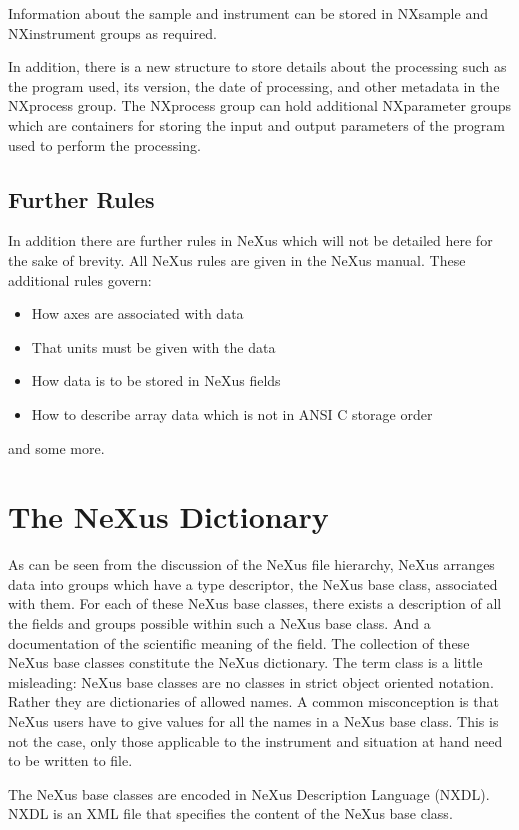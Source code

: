 \documentclass[%
 aip,
rsi,
 amsmath,amssymb,
 reprint,%
]{revtex4-1}
\begin{document}
Information about the sample and instrument can be stored in NXsample and NXinstrument groups as required. 

In addition, there is a new structure to store details about the processing such as the program used, its version, 
the date of processing, and other metadata 
in the NXprocess group. The NXprocess group can hold additional NXparameter groups which are containers 
for storing the input and output parameters of the program used to perform the processing. 

\subsection{Further Rules}

In addition there are further rules in NeXus which will not be detailed here for the sake of brevity. 
All NeXus rules are given in the NeXus manual\cite{nxman}. These additional rules govern:
\begin{itemize}
\item How axes are associated with data
\item That units must be given with the data
\item How data is to be stored in NeXus fields
\item How to describe array data which is not in ANSI C storage order
\end{itemize}
and some more.

\section{The NeXus Dictionary}

As can be seen from the discussion of the NeXus file hierarchy, NeXus arranges data into groups which have a 
type descriptor, the NeXus base class, associated with them. For each of these NeXus base classes, there 
exists a description of all the fields and groups possible within such a NeXus base class. And a documentation 
of the scientific meaning of the field.  The collection of these NeXus base classes constitute the NeXus dictionary. 
The term class is a little misleading: NeXus base classes are no classes in strict object oriented notation. Rather 
they are dictionaries of allowed names. A common misconception is that NeXus users have to give values for all the 
names in a NeXus base class. This is not the case, only those applicable to the instrument and situation at hand need 
to be written to file.

The NeXus base classes are encoded in NeXus Description Language (NXDL).
NXDL is an XML file that specifies the content of the NeXus base class.
\end{document}
